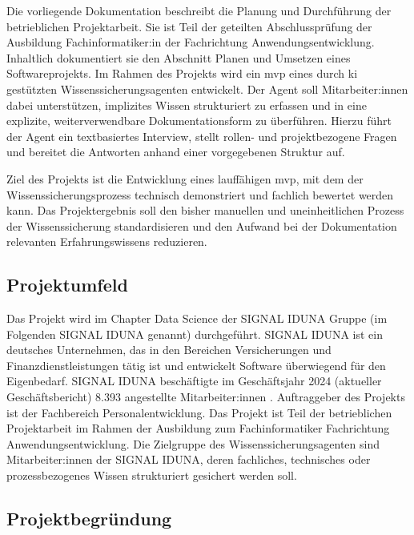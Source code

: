 \documentclass[
  10pt,
  ngerman,
  a4paper,
  toc=graduated,
  numbers=noenddot,
  headings=standardclasses,
  nonumberlist
]{scrartcl}
\begin{document}
Die vorliegende Dokumentation beschreibt die Planung und Durchführung der betrieblichen Projektarbeit. Sie ist Teil der geteilten Abschlussprüfung der Ausbildung Fachinformatiker:in der Fachrichtung Anwendungsentwicklung. Inhaltlich dokumentiert sie den Abschnitt \glqq Planen und Umsetzen eines Softwareprojekts\grqq. Im Rahmen des Projekts wird ein \gls{mvp} eines durch \gls{ki} gestützten Wissenssicherungsagenten entwickelt. Der Agent soll Mitarbeiter:innen dabei unterstützen, implizites Wissen strukturiert zu erfassen und in eine explizite, weiterverwendbare Dokumentationsform zu überführen. Hierzu führt der Agent ein textbasiertes Interview, stellt rollen- und projektbezogene Fragen und bereitet die Antworten anhand einer vorgegebenen Struktur auf.

Ziel des Projekts ist die Entwicklung eines lauffähigen \gls{mvp}, mit dem der Wissenssicherungsprozess technisch demonstriert und fachlich bewertet werden kann. Das Projektergebnis soll den bisher manuellen und uneinheitlichen Prozess der Wissenssicherung standardisieren und den Aufwand bei der Dokumentation relevanten Erfahrungswissens reduzieren.

\subsection{Projektumfeld}
\label{projektumfeld}
Das Projekt wird im Chapter Data Science der SIGNAL IDUNA Gruppe (im Folgenden SIGNAL IDUNA genannt) durchgeführt. SIGNAL IDUNA ist ein deutsches Unternehmen, das in den Bereichen Versicherungen und Finanzdienstleistungen tätig ist und entwickelt Software überwiegend für den Eigenbedarf. SIGNAL IDUNA beschäftigte im Geschäftsjahr 2024 (aktueller Geschäftsbericht) 8.393 angestellte Mitarbeiter:innen \cite{signal_iduna_allgemeine_versicherung_ag_geschaeftsbericht_2024}. Auftraggeber des Projekts ist der Fachbereich Personalentwicklung. Das Projekt ist Teil der betrieblichen Projektarbeit im Rahmen der Ausbildung zum Fachinformatiker Fachrichtung Anwendungsentwicklung. Die Zielgruppe des Wissenssicherungsagenten sind Mitarbeiter:innen der SIGNAL IDUNA, deren fachliches, technisches oder prozessbezogenes Wissen strukturiert gesichert werden soll.

\subsection{Projektbegründung}
\label{projektbegründung}
\end{document}
